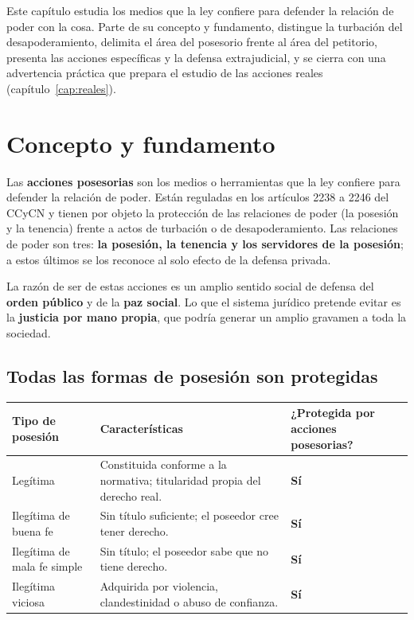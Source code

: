 \documentclass[12pt,oneside]{book}
\begin{document}
Este capítulo estudia los medios que la ley confiere para defender la relación de poder con la cosa. Parte de su concepto y fundamento, distingue la turbación del desapoderamiento, delimita el área del posesorio frente al área del petitorio, presenta las acciones específicas y la defensa extrajudicial, y se cierra con una advertencia práctica que prepara el estudio de las acciones reales (capítulo~\ref{cap:reales}).

\section{Concepto y fundamento}

Las \textbf{acciones posesorias} son los medios o herramientas que la ley confiere para defender la relación de poder. Están reguladas en los artículos 2238 a 2246 del CCyCN y tienen por objeto la protección de las relaciones de poder (la posesión y la tenencia) frente a actos de turbación o de desapoderamiento. Las relaciones de poder son tres: \textbf{la posesión, la tenencia y los servidores de la posesión}; a estos últimos se los reconoce al solo efecto de la defensa privada.

La razón de ser de estas acciones es un amplio sentido social de defensa del \textbf{orden público} y de la \textbf{paz social}. Lo que el sistema jurídico pretende evitar es la \textbf{justicia por mano propia}, que podría generar un amplio gravamen a toda la sociedad.

\subsection{Todas las formas de posesión son protegidas}

\begin{table}[H]
\centering
\begin{tabularx}{\textwidth}{@{}>{\raggedright\arraybackslash}p{}>{\raggedright\arraybackslash}X>{\centering\arraybackslash}p{}@{}}
\toprule
\textbf{Tipo de posesión} & \textbf{Características} & \textbf{¿Protegida por acciones posesorias?} \\
\midrule
Legítima & Constituida conforme a la normativa; titularidad propia del derecho real. & \textbf{Sí} \\
Ilegítima de buena fe & Sin título suficiente; el poseedor cree tener derecho. & \textbf{Sí} \\
Ilegítima de mala fe simple & Sin título; el poseedor sabe que no tiene derecho. & \textbf{Sí} \\
Ilegítima viciosa & Adquirida por violencia, clandestinidad o abuso de confianza. & \textbf{Sí} \\
\bottomrule
\end{tabularx}
\end{table}
\end{document}
